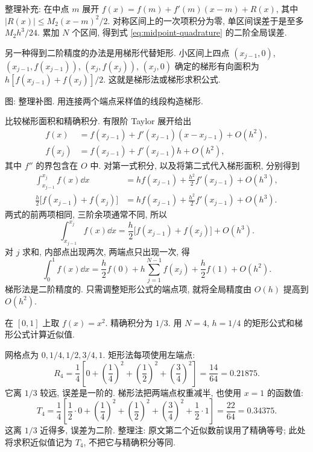 \begin{remark}
整理补充: 在中点 $m$ 展开 $f(x)=f(m)+f'(m)(x-m)+R(x)$, 其中 $|R(x)|\leq M_2(x-m)^2/2$. 对称区间上的一次项积分为零, 单区间误差于是至多 $M_2h^3/24$. 累加 $N$ 个区间, 得到式 \eqref{eq:midpoint-quadrature} 的二阶全局误差.
\end{remark}

另一种得到二阶精度的办法是用梯形代替矩形. 小区间上四点 $(x_{j-1},0)$, $(x_{j-1},f(x_{j-1}))$, $(x_j,f(x_j))$, $(x_j,0)$ 确定的梯形有向面积为 $h[f(x_{j-1})+f(x_j)]/2$. 这就是梯形法或梯形求积公式.

\begin{center}
\par 图: 整理补图. 用连接两个端点采样值的线段构造梯形.
\end{center}

比较梯形面积和精确积分. 有限阶 Taylor 展开给出
\begin{align*}
f(x)&=f(x_{j-1})+f'(x_{j-1})(x-x_{j-1})+O(h^2),\\
f(x_j)&=f(x_{j-1})+f'(x_{j-1})h+O(h^2),
\end{align*}
其中 $f''$ 的界包含在 $O$ 中. 对第一式积分, 以及将第二式代入梯形面积, 分别得到
\begin{align*}
\int_{x_{j-1}}^{x_j}f(x)\dd x
&=hf(x_{j-1})+\frac{h^2}{2}f'(x_{j-1})+O(h^3),\\
\frac h2\bigl[f(x_{j-1})+f(x_j)\bigr]
&=hf(x_{j-1})+\frac{h^2}{2}f'(x_{j-1})+O(h^3).
\end{align*}
两式的前两项相同, 三阶余项通常不同, 所以
\[
\int_{x_{j-1}}^{x_j}f(x)\dd x=\frac h2\bigl[f(x_{j-1})+f(x_j)\bigr]+O(h^3).
\]
对 $j$ 求和, 内部点出现两次, 两端点只出现一次, 得
\begin{equation}\label{eq:trapezoid}
\int_0^1 f(x)\dd x=\frac h2f(0)+h\sum_{j=1}^{N-1}f(x_j)+\frac h2f(1)+O(h^2).
\end{equation}
梯形法是二阶精度的. 只需调整矩形公式的端点项, 就将全局精度由 $O(h)$ 提高到 $O(h^2)$.

\begin{example}\label{ex:quadrature-square}
在 $[0,1]$ 上取 $f(x)=x^2$. 精确积分为 $1/3$. 用 $N=4$, $h=1/4$ 的矩形公式和梯形公式计算近似值.
\end{example}
\begin{solution}
网格点为 $0,1/4,1/2,3/4,1$. 矩形法每项使用左端点:
\[
R_4=\frac14\left[0+\left(\frac14\right)^2+\left(\frac12\right)^2+\left(\frac34\right)^2\right]
=\frac{14}{64}=0.21875.
\]
它离 $1/3$ 较远, 误差是一阶的. 梯形法把两端点权重减半, 也使用 $x=1$ 的函数值:
\[
T_4=\frac14\left[\frac12\cdot0+\left(\frac14\right)^2+\left(\frac12\right)^2+\left(\frac34\right)^2+\frac12\cdot1\right]
=\frac{22}{64}=0.34375.
\]
这离 $1/3$ 近得多, 误差为二阶. 整理注: 原文第二个近似数前误用了精确等号; 此处将求积近似值记为 $T_4$, 不把它与精确积分等同.
\end{solution}

